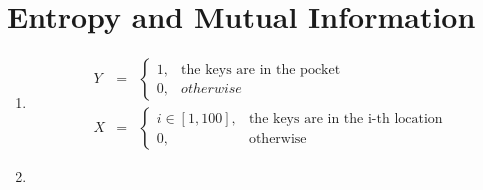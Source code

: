 \documentclass[a4paper,10pt]{hw}
\begin{document}
\section{Entropy and Mutual Information}

\begin{enumerate}

\item %

$$
\begin{array}{rcl}
Y &=& \begin{cases} 1,& \text{the keys are in the pocket} \\ 0, & otherwise \end{cases} \\
X &=& \begin{cases} i\in[1,100],&\text{the keys are in the i-th location} \\ 0, & \text{otherwise} \end{cases}
\end{array}
$$

\item %


\hfill\\

\newcommand{\pyzxz}{
$$
\begin{array}{lcl}
p(X=0, Y=0) & = & 0\\
p(X=0 | Y=0) & = & 0\\
p(Y=0 | X=0) & = & 0
\end{array}
$$
}

\newcommand{\pylxz}{
$$
\begin{array}{lcl}
p(X=0, Y=1) & = & 0.99\\
p(X=0 | Y=1) & = & 1\\
p(Y=1 | X=0) & = & 1
\end{array}
$$
}

\newcommand{\pylxi}{
$$
\begin{array}{lcl}
i > 0 &&\\
p(X=i, Y=1) & = & 0\\
p(X=i | Y=1) & = & 0\\
p(Y=1 | X=i) & = & 0
\end{array}
$$
}

\newcommand{\pyzxi}{
$$
\begin{array}{lcl}
i > 0 &&\\
p(X=i, Y=0) & = & 0.0001\\
p(X=i | Y=0) & = & 0.01\\
p(Y=0 | X=i) & = & 1
\end{array}
$$
}


\end{enumerate}
\end{document}
